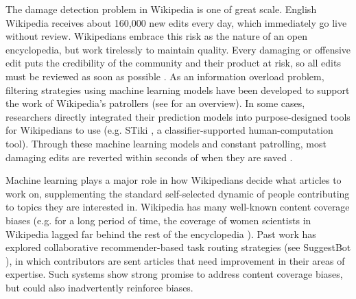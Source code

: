  The damage detection problem in Wikipedia is one of great scale.  English Wikipedia receives about 160,000 new edits every day, which immediately go live without review.  Wikipedians embrace this risk as the nature of an open encyclopedia, but work tirelessly to maintain quality. Every damaging or offensive edit puts the credibility of the community and their product at risk, so all edits must be reviewed as soon as possible \cite{geiger2010work}. As an information overload problem, filtering strategies using machine learning models have been developed to support the work of Wikipedia's patrollers (see \cite{adler2011wikipedia} for an overview).  In some cases, researchers directly integrated their prediction models into purpose-designed tools for Wikipedians to use (e.g. STiki \cite{west2010stiki}, a classifier-supported human-computation tool). Through these machine learning models and constant patrolling, most damaging edits are reverted within seconds of when they are saved \cite{geiger2013levee}.

Machine learning plays a major role in how Wikipedians decide what articles to work on, supplementing the standard self-selected dynamic of people contributing to topics they are interested in. Wikipedia has many well-known content coverage biases (e.g. for a long period of time, the coverage of women scientists in Wikipedia lagged far behind the rest of the encyclopedia \cite{halfaker2017interpolating}). Past work has explored collaborative recommender-based task routing strategies (see SuggestBot \cite{cosley2007suggestbot}), in which contributors are sent articles that need improvement in their areas of expertise. Such systems show strong promise to address content coverage biases, but could also inadvertently reinforce biases.

